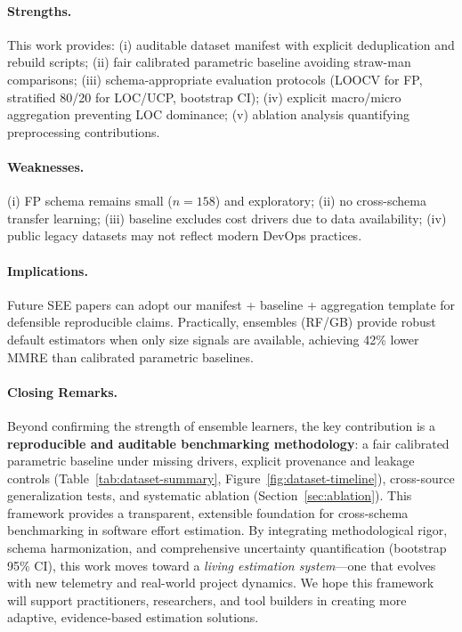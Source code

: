 \documentclass{ieeeaccess}
\begin{document}
\paragraph{Strengths.}
This work provides: (i) auditable dataset manifest with explicit deduplication and rebuild scripts; (ii) fair calibrated parametric baseline avoiding straw-man comparisons; (iii) schema-appropriate evaluation protocols (LOOCV for FP, stratified 80/20 for LOC/UCP, bootstrap CI); (iv) explicit macro/micro aggregation preventing LOC dominance; (v) ablation analysis quantifying preprocessing contributions.

\paragraph{Weaknesses.}
(i) FP schema remains small ($n=158$) and exploratory; (ii) no cross-schema transfer learning; (iii) baseline excludes cost drivers due to data availability; (iv) public legacy datasets may not reflect modern DevOps practices.

\paragraph{Implications.}
Future SEE papers can adopt our manifest + baseline + aggregation template for defensible reproducible claims. Practically, ensembles (RF/GB) provide robust default estimators when only size signals are available, achieving 42\% lower MMRE than calibrated parametric baselines.

\paragraph{Closing Remarks.}
Beyond confirming the strength of ensemble learners,
the key contribution is a \textbf{reproducible and auditable benchmarking methodology}:
a fair calibrated parametric baseline under missing drivers,
explicit provenance and leakage controls (Table~\ref{tab:dataset-summary}, Figure~\ref{fig:dataset-timeline}),
cross-source generalization tests,
and systematic ablation (Section~\ref{sec:ablation}).
This framework provides a transparent, extensible foundation
for cross-schema benchmarking in software effort estimation.
By integrating methodological rigor, schema harmonization,
and comprehensive uncertainty quantification (bootstrap 95\% CI),
this work moves toward a \textit{living estimation system}---one that evolves
with new telemetry and real-world project dynamics.
We hope this framework will support practitioners, researchers,
and tool builders in creating more adaptive,
evidence-based estimation solutions.
\end{document}
